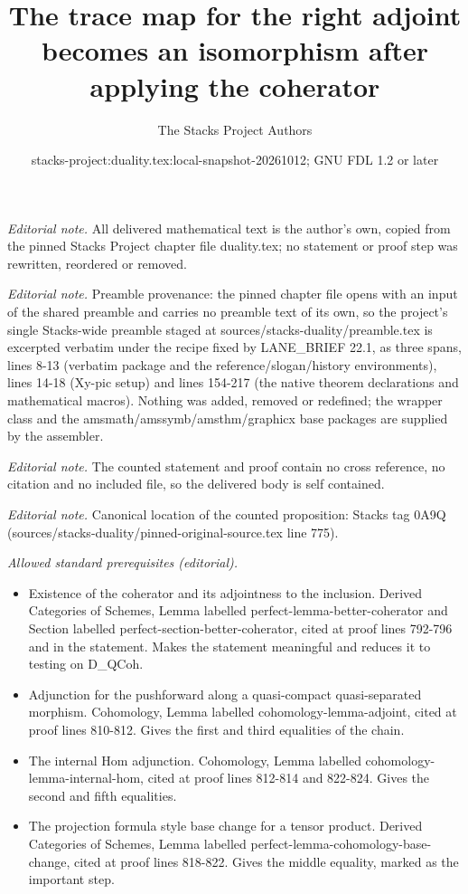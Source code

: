 \documentclass[10pt,a4paper]{amsart}
\title{The trace map for the right adjoint becomes an isomorphism after applying the coherator}
\author{The Stacks Project Authors}
\date{stacks-project:duality.tex:local-snapshot-20261012; GNU FDL 1.2 or later}
\theoremstyle{plain}
\theoremstyle{definition}
\theoremstyle{remark}
\numberwithin{equation}{subsection}
\begin{document}
\maketitle
\noindent\textit{Editorial note.} All delivered mathematical text is the author's own, copied from the pinned Stacks Project chapter file duality.tex; no statement or proof step was rewritten, reordered or removed.\par\medskip
\noindent\textit{Editorial note.} Preamble provenance: the pinned chapter file opens with an input of the shared preamble and carries no preamble text of its own, so the project's single Stacks-wide preamble staged at sources/stacks-duality/preamble.tex is excerpted verbatim under the recipe fixed by LANE\_BRIEF 22.1, as three spans, lines 8-13 (verbatim package and the reference/slogan/history environments), lines 14-18 (Xy-pic setup) and lines 154-217 (the native theorem declarations and mathematical macros). Nothing was added, removed or redefined; the wrapper class and the amsmath/amssymb/amsthm/graphicx base packages are supplied by the assembler.\par\medskip
\noindent\textit{Editorial note.} The counted statement and proof contain no cross reference, no citation and no included file, so the delivered body is self contained.\par\medskip
\noindent\textit{Editorial note.} Canonical location of the counted proposition: Stacks tag 0A9Q (sources/stacks-duality/pinned-original-source.tex line 775).\par\medskip
\noindent\textit{Allowed standard prerequisites (editorial).}\begin{itemize}
\item Existence of the coherator and its adjointness to the inclusion. Derived Categories of Schemes, Lemma labelled perfect-lemma-better-coherator and Section labelled perfect-section-better-coherator, cited at proof lines 792-796 and in the statement. Makes the statement meaningful and reduces it to testing on D\_QCoh.
\item Adjunction for the pushforward along a quasi-compact quasi-separated morphism. Cohomology, Lemma labelled cohomology-lemma-adjoint, cited at proof lines 810-812. Gives the first and third equalities of the chain.
\item The internal Hom adjunction. Cohomology, Lemma labelled cohomology-lemma-internal-hom, cited at proof lines 812-814 and 822-824. Gives the second and fifth equalities.
\item The projection formula style base change for a tensor product. Derived Categories of Schemes, Lemma labelled perfect-lemma-cohomology-base-change, cited at proof lines 818-822. Gives the middle equality, marked as the important step.
\end{itemize}\medskip
\end{document}
